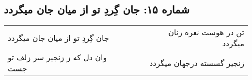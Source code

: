 \begin{center}
\section*{شماره ۱۵: جان گِردِ تو از میان جان میگردد}
\label{sec:015}
\begin{longtable}{l p{0.5cm} r}
جان گِردِ تو از میان جان میگردد
&&
تن در هوست نعره زنان میگردد
\\
وان دل که ز زنجیر سر زلف تو جست
&&
زنجیر گسسته درجهان میگردد
\\
\end{longtable}
\end{center}
